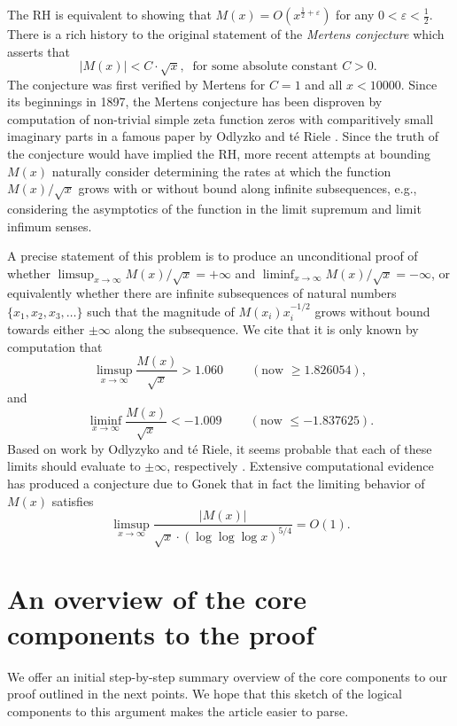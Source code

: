\documentclass[11pt,reqno,a4letter]{article}
\numberwithin{figure}{section}
\numberwithin{table}{section}
\newcommand{\cf}{\textit{cf.\ }}
\newcommand{\seqnum}[1]{\href{http://oeis.org/#1}{\color{ProcessBlue}{\underline{#1}}}}
\theoremstyle{plain}
\numberwithin{theorem}{section}
\theoremstyle{definition}
\begin{document}
The RH is equivalent to showing that 
$M(x) = O\left(x^{\frac{1}{2}+\varepsilon}\right)$ for any 
$0 < \varepsilon < \frac{1}{2}$. 
There is a rich history to the original statement of the \emph{Mertens conjecture} which 
asserts that 
\[ 
|M(x)| < C \cdot \sqrt{x},\ \text{ for some absolute constant $C > 0$. }
\] 
The conjecture was first verified by Mertens for $C = 1$ and all $x < 10000$. 
Since its beginnings in 1897, the Mertens conjecture has been disproven by computation 
of non-trivial simple zeta function zeros with comparitively small imaginary parts in a famous paper by 
Odlyzko and t\'{e} Riele \cite{ODLYZ-TRIELE}. 
Since the truth of the conjecture would have implied the RH, more recent attempts 
at bounding $M(x)$ naturally consider determining the rates at which the function 
$M(x) / \sqrt{x}$ grows with or without bound along infinite 
subsequences, e.g., considering the asymptotics of the function in the limit supremum and 
limit infimum senses. 

A precise statement of this 
problem is to produce an unconditional proof of whether 
$\limsup_{x \rightarrow \infty} M(x) / \sqrt{x} = +\infty$ and 
$\liminf_{x \rightarrow \infty} M(x) / \sqrt{x} = -\infty$, or 
equivalently whether there are infinite subsequences of natural numbers 
$\{x_1, x_2, x_3, \ldots\}$ such that the magnitude of 
$M(x_i) x_i^{-1/2}$ grows without bound towards either $\pm \infty$ 
along the subsequence. 
We cite that it is only known by computation 
that \cite[\cf \S 4.1]{PRIMEREC} 
\cite[\cf \seqnum{A051400}; \seqnum{A051401}]{OEIS} 
\[
\limsup_{x\rightarrow\infty} \frac{M(x)}{\sqrt{x}} > 1.060\ \qquad (\text{now } \geq 1.826054), 
\] 
and 
\[ 
\liminf_{x\rightarrow\infty} \frac{M(x)}{\sqrt{x}} < -1.009\ \qquad (\text{now } \leq -1.837625). 
\] 
Based on work by Odlyzyko and t\'{e} Riele, it seems probable that 
each of these limits should evaluate to $\pm \infty$, respectively 
\cite{ODLYZ-TRIELE,MREVISITED,ORDER-MERTENSFN,HURST-2017}. 
Extensive computational evidence has produced 
a conjecture due to Gonek that in fact the limiting behavior of 
$M(x)$ satisfies \cite{NG-MERTENS}
$$\limsup_{x \rightarrow \infty} \frac{|M(x)|}{\sqrt{x} \cdot (\log\log\log x)^{5/4}} = O(1).$$ 

\newpage
\section{An overview of the core components to the proof} 

We offer an initial step-by-step summary overview of the core components 
to our proof outlined in the next points. 
We hope that this sketch of the logical components 
to this argument makes the article easier to parse. 
\end{document}
